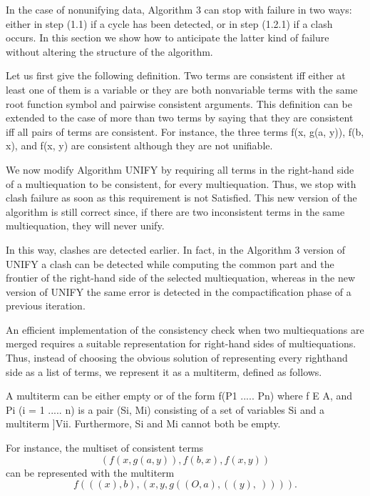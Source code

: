 \label{mmalg5}

In the case of nonunifying data, Algorithm 3 can stop with failure in two ways:
either in step (1.1) if a cycle has been detected, or in step (1.2.1) if a clash occurs.
In this section we show how to anticipate the latter kind of failure without
altering the structure of the algorithm. 

Let us first give the following definition. Two terms are consistent iff either at
least one of them is a variable or they are both nonvariable terms with the same
root function symbol and pairwise consistent arguments. This definition can be
extended to the case of more than two terms by saying that they are consistent
iff all pairs of terms are consistent. For instance, the three terms f(x, g(a, y)),
f(b, x), and f(x, y) are consistent although they are not unifiable. 

We now modify Algorithm UNIFY by requiring all terms in the right-hand
side of a multiequation to be consistent, for every multiequation. Thus, we stop
with clash failure as soon as this requirement is not Satisfied. This new version of
the algorithm is still correct since, if there are two inconsistent terms in the same
multiequation, they will never unify. 

In this way, clashes are detected earlier. In fact, in the Algorithm 3 version of
UNIFY a clash can be detected while computing the common part and the
frontier of the right-hand side of the selected multiequation, whereas in the new
version of UNIFY the same error is detected in the compactification phase of a
previous iteration. 

An efficient implementation of the consistency check when two multiequations
are merged requires a suitable representation for right-hand sides of multiequations.
Thus, instead of choosing the obvious solution of representing every righthand
side as a list of terms, we represent it as a multiterm, defined as follows. 

A multiterm can be either empty or of the form f(P1 ..... Pn) where f E A, and
Pi (i = 1 ..... n) is a pair (Si, Mi) consisting of a set of variables Si and a
multiterm ]Vii. Furthermore, Si and Mi cannot both be empty. 

For instance, the multiset of consistent terms
\[(f(x, g(a, y)), f(b, x), f(x, y))\]
can be represented with the multiterm
\[f(((x), b), ({x,y},g((O, a), ((y), ~)))).\]

